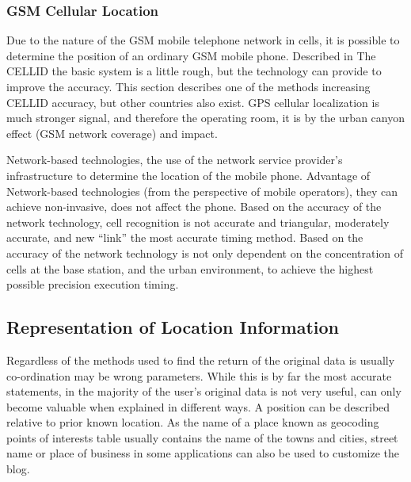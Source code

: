 \documentclass[12pt,a4paper,titlepage]{article}
\begin{document}
\subsubsection{GSM Cellular Location} %
\label{ssub:gsm_cellular_location}
Due to the nature of the GSM mobile telephone network in cells, it is possible to determine the position of an ordinary GSM mobile phone. Described in The CELLID the basic system is a little rough, but the technology can provide to improve the accuracy. This section describes one of the methods increasing CELLID accuracy, but other countries also exist. GPS cellular localization is much stronger signal, and therefore the operating room, it is by the urban canyon effect (GSM network coverage) and impact. \cite{DRoza:2003wz}

Network-based technologies, the use of the network service provider's infrastructure to determine the location of the mobile phone. Advantage of Network-based technologies (from the perspective of mobile operators), they can achieve non-invasive, does not affect the phone. Based on the accuracy of the network technology, cell recognition is not accurate and triangular, moderately accurate, and new ``link'' the most accurate timing method. Based on the accuracy of the network technology is not only dependent on the concentration of cells at the base station, and the urban environment, to achieve the highest possible precision execution timing. \cite{wiki-cellloc}


\subsection{Representation of Location Information} %
\label{sub:representation_of_location_information}
Regardless of the methods used to find the return of the original data is usually co-ordination may be wrong parameters. While this is by far the most accurate statements, in the majority of the user's original data is not very useful, can only become valuable when explained in different ways. A position can be described relative to prior known location. As the name of a place known as geocoding points of interests table usually contains the name of the towns and cities, street name or place of business in some applications can also be used to customize the blog. \cite{DRoza:2003wz}

\end{document}
